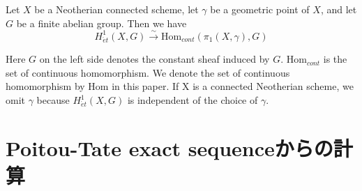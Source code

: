 \documentclass{ujarticle}
\newcommand\mr{\mathrm}
\begin{document}
\begin{prop}
Let $X$ be a Neotherian connected scheme, let $\gamma$ be a geometric point of $X$, and let $G$ be a finite abelian group.
Then we have
\begin{equation*}
H^1_{\acute{e}t}(X,G) \stackrel{\sim}{\to} \mathrm{Hom}_{cont}(\pi_1(X,\gamma),G)
\end{equation*}

Here $G$ on the left side  denotes  the constant sheaf induced by $G$. $\mr{Hom}_{cont}$ is the set of continuous homomorphism.
We denote the set of continuous homomorphism  by $\mathrm{Hom}$ in this paper.
If X is a connected Neotherian scheme, we omit $\gamma$ because $H^1_{\acute{e}t}(X,G)$ is independent of the choice of $\gamma$.
\end{prop}


\section{Poitou-Tate exact sequenceからの計算}
\label{sec:Poitou-Tate exact sequenceからの計算}
\end{document}
